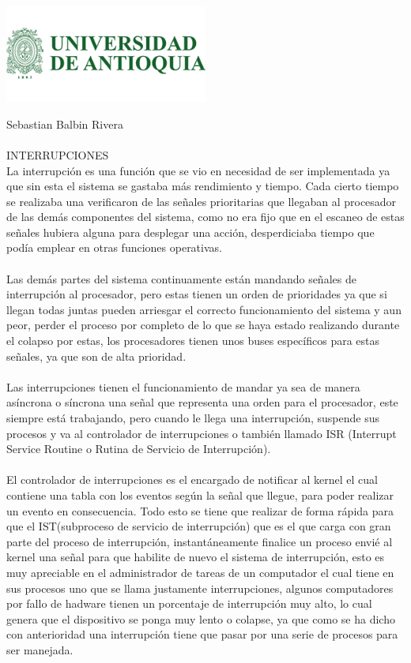 \documentclass{letter}
\begin{document}
\begin{center}
\includegraphics[width=0.5\textwidth]{logo-udea.png}\\
\end{center}

Sebastian Balbin Rivera\\\\
INTERRUPCIONES\\

La interrupción es una función que se vio en necesidad de ser implementada ya que sin esta el sistema se gastaba más rendimiento y tiempo. Cada cierto tiempo se realizaba una verificaron de las señales prioritarias que llegaban al procesador de las demás componentes del sistema, como no era fijo que en el escaneo de estas señales hubiera alguna para desplegar una acción, desperdiciaba tiempo que podía emplear en otras funciones operativas. \\\\
Las demás partes del sistema continuamente están mandando señales de interrupción al procesador, pero estas tienen un orden de prioridades ya que si llegan todas juntas pueden arriesgar el correcto funcionamiento del sistema y aun peor, perder el proceso por completo de lo que se haya estado realizando durante el colapso por estas, los procesadores tienen unos buses específicos para estas señales, ya que son de alta prioridad.\\\\ 
Las interrupciones tienen el funcionamiento de mandar ya sea de manera asíncrona o síncrona una señal que representa una orden para el procesador, este siempre está trabajando, pero cuando le llega una interrupción, suspende sus procesos y va al controlador de interrupciones o también llamado ISR (Interrupt Service Routine o Rutina de Servicio de Interrupción).\\\\
El controlador de interrupciones es el encargado de notificar al kernel el cual contiene una tabla con los eventos según la señal que llegue, para poder realizar un evento en consecuencia. Todo esto se tiene que realizar de forma rápida para que el IST(subproceso de servicio de interrupción) que es el que carga con gran parte del proceso de interrupción, instantáneamente finalice un proceso envié al kernel una señal para que habilite de nuevo el sistema de interrupción, esto es muy apreciable en el administrador de tareas de un computador el cual tiene en sus procesos uno que se llama justamente interrupciones, algunos computadores por fallo de hadware tienen un porcentaje de interrupción muy alto, lo cual genera que el dispositivo se ponga muy lento o colapse, ya que como se ha dicho con anterioridad una interrupción tiene que pasar por una serie de procesos para ser manejada.\\\\
\end{document}
